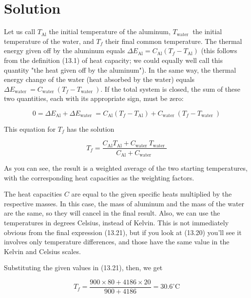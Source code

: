 \documentclass[10pt]{article}
\begin{document}
\section*{Solution}
Let us call $T_{\mathrm{Al}}$ the initial temperature of the aluminum, $T_{\text {water }}$ the initial temperature of the water, and $T_{f}$ their final common temperature. The thermal energy given off by the aluminum equals $\Delta E_{\mathrm{Al}}=C_{\mathrm{Al}}\left(T_{f}-T_{\mathrm{Al}}\right)$ (this follows from the definition (13.1) of heat capacity; we could equally well call this quantity "the heat given off by the aluminum"). In the same way, the thermal energy change of the water (heat absorbed by the water) equals $\Delta E_{\text {water }}=C_{\text {water }}\left(T_{f}-T_{\text {water }}\right)$. If the total system is closed, the sum of these two quantities, each with its appropriate sign, must be zero:


\begin{equation*}
0=\Delta E_{\mathrm{Al}}+\Delta E_{\text {water }}=C_{\mathrm{Al}}\left(T_{f}-T_{\mathrm{Al}}\right)+C_{\text {water }}\left(T_{f}-T_{\text {water }}\right) \tag{13.20}
\end{equation*}


This equation for $T_{f}$ has the solution


\begin{equation*}
T_{f}=\frac{C_{\mathrm{Al}} T_{\mathrm{Al}}+C_{\text {water }} T_{\text {water }}}{C_{\mathrm{Al}}+C_{\text {water }}} \tag{13.21}
\end{equation*}


As you can see, the result is a weighted average of the two starting temperatures, with the corresponding heat capacities as the weighting factors.

The heat capacities $C$ are equal to the given specific heats multiplied by the respective masses. In this case, the mass of aluminum and the mass of the water are the same, so they will cancel in the final result. Also, we can use the temperatures in degrees Celsius, instead of Kelvin. This is not immediately obvious from the final expression (13.21), but if you look at (13.20) you'll see it involves only temperature differences, and those have the same value in the Kelvin and Celsius scales.

Substituting the given values in (13.21), then, we get


\begin{equation*}
T_{f}=\frac{900 \times 80+4186 \times 20}{900+4186}=30.6^{\circ} \mathrm{C} \tag{13.22}
\end{equation*}
\end{document}
